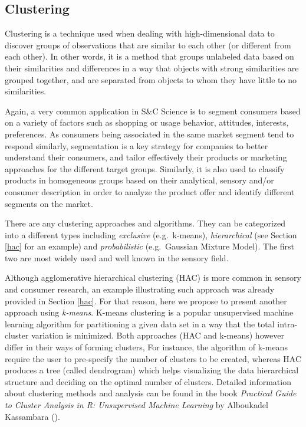 \documentclass[
]{krantz}
\makeatletter
\newenvironment{Shaded}{\begin{snugshade}}{\end{snugshade}}
\newcommand{\DecValTok}[1]{\textcolor[rgb]{0.06,0.06,0.06}{#1}}
\newcommand{\FunctionTok}[1]{\textcolor[rgb]{0,0,0}{#1}}
\newcommand{\NormalTok}[1]{#1}
\newcommand{\OtherTok}[1]{\textcolor[rgb]{0.37,0.37,0.37}{#1}}
\newcommand{\SpecialCharTok}[1]{\textcolor[rgb]{0,0,0}{#1}}
\newenvironment{kframe}{%
\medskip{}
\setlength{\fboxsep}{.8em}
 \def\at@end@of@kframe{}%
 \ifinner\ifhmode%
  \def\at@end@of@kframe{\end{minipage}}%
  \begin{minipage}{\columnwidth}%
 \fi\fi%
 \def\FrameCommand##1{\hskip\@totalleftmargin \hskip-\fboxsep
 \colorbox{shadecolor}{##1}\hskip-\fboxsep
     \hskip-\linewidth \hskip-\@totalleftmargin \hskip\columnwidth}%
 \MakeFramed {\advance\hsize-\width
   \@totalleftmargin\z@ \linewidth\hsize
   \@setminipage}}%
 {\par\unskip\endMakeFramed%
 \at@end@of@kframe}
\renewenvironment{Shaded}{\begin{kframe}}{\end{kframe}}
\makeatother
\begin{document}
\begin{Shaded}
\end{Shaded}

\hypertarget{clustering}{%
\subsection{Clustering}\label{clustering}}

Clustering is a technique used when dealing with high-dimensional data to discover groups of observations that are similar to each other (or different from each other). In other words, it is a method that groups unlabeled data based on their similarities and differences in a way that objects with strong similarities are grouped together, and are separated from objects to whom they have little to no similarities.

Again, a very common application in S\&C Science is to segment consumers based on a variety of factors such as shopping or usage behavior, attitudes, interests, preferences. As consumers being associated in the same market segment tend to respond similarly, segmentation is a key strategy for companies to better understand their consumers, and tailor effectively their products or marketing approaches for the different target groups. Similarly, it is also used to classify products in homogeneous groups based on their analytical, sensory and/or consumer description in order to analyze the product offer and identify different segments on the market.

There are any clustering approaches and algorithms. They can be categorized into a different types including \emph{exclusive} (e.g.~k-means), \emph{hierarchical} (see Section \ref{hac} for an example) and \emph{probabilistic} (e.g.~Gaussian Mixture Model). The first two are most widely used and well known in the sensory field.

Although agglomerative hierarchical clustering (HAC) is more common in sensory and consumer research, an example illustrating such approach was already provided in Section \ref{hac}. For that reason, here we propose to present another approach using \emph{k-means}.
K-means clustering is a popular unsupervised machine learning algorithm for partitioning a given data set in a way that the total intra-cluster variation is minimized. Both approaches (HAC and k-means) however differ in their ways of forming clusters, For instance, the algorithm of k-means require the user to pre-specify the number of clusters to be created, whereas HAC produces a tree (called dendrogram) which helps visualizing the data hierarchical structure and deciding on the optimal number of clusters. Detailed information about clustering methods and analysis can be found in the book \emph{Practical Guide to Cluster Analysis in R: Unsupervised Machine Learning} by Alboukadel Kassambara (\citet{Kassambara2017}).
\end{document}
